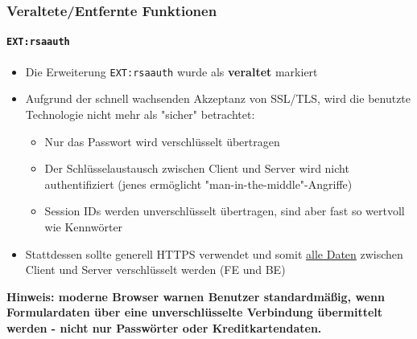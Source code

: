 \begin{frame}[fragile]
	\frametitle{Veraltete/Entfernte Funktionen}
	\framesubtitle{\texttt{EXT:rsaauth}}

	\begin{itemize}
		\item Die Erweiterung \texttt{EXT:rsaauth} wurde als \textbf{veraltet} markiert
		\item Aufgrund der schnell wachsenden Akzeptanz von SSL/TLS, wird die benutzte
			Technologie nicht mehr als "sicher" betrachtet:

			\begin{itemize}
				\item Nur das Passwort wird verschlüsselt übertragen
				\item Der Schlüsselaustausch zwischen Client und Server wird nicht authentifiziert
					(jenes ermöglicht "man-in-the-middle"-Angriffe)
				\item Session IDs werden unverschlüsselt übertragen, sind aber fast so wertvoll wie
					Kennwörter
			\end{itemize}

		\item Stattdessen sollte generell HTTPS verwendet und somit \underline{alle Daten}
			zwischen Client und Server verschlüsselt werden (FE und BE)

	\end{itemize}

	\smaller
		\textbf{Hinweis: moderne Browser warnen Benutzer standardmäßig, wenn Formulardaten über eine
		   unverschlüsselte Verbindung übermittelt werden - nicht nur Passwörter oder Kreditkartendaten.}
	\normalsize

\end{frame}

